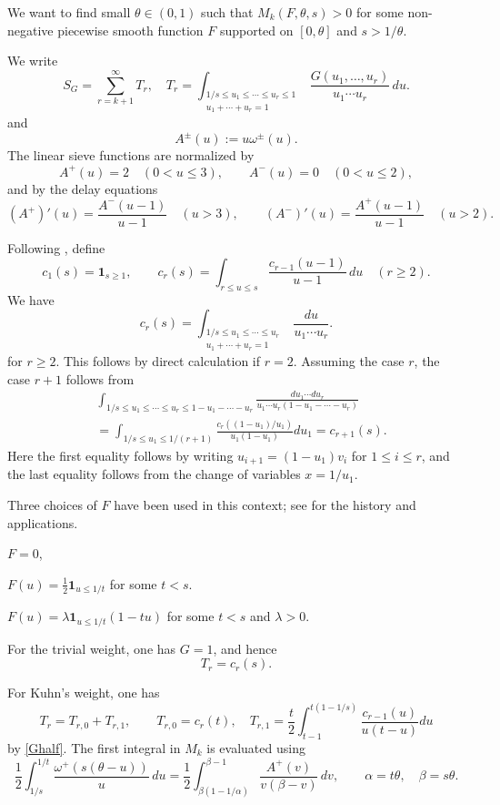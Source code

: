 \documentclass{amsart}
\theoremstyle{definition}
\theoremstyle{remark}
\newcommand{\1}{
    \bm{1}
}
\begin{document}
We want to find small $\theta \in (0,1)$ such that $M_k(F,\theta,s)>0$ for some non-negative piecewise smooth function $F$ supported on $[0,\theta]$ and $s>1/\theta$. 


We write
\[ S_G = 
\sum_{r=k+1}^{\infty} T_r, \quad T_r = 
\int_{\substack{1/s\le u_1\le \cdots\le u_r\le 1\\
u_1+\cdots+u_r=1}}
\frac{G(u_1,\ldots,u_r)}{u_1\cdots u_r}\,
du.
\]
and
\[
A^\pm(u):=u\omega^\pm(u).
\]
The linear sieve functions are normalized by
\[
A^+(u)=2 \quad (0<u\le 3),\qquad
A^-(u)=0 \quad (0<u\le 2),
\]
and by the delay equations
\[
(A^+)'(u)=\frac{A^-(u-1)}{u-1}\quad (u>3),\qquad
(A^-)'(u)=\frac{A^+(u-1)}{u-1}\quad (u>2).
\]

Following \cite{matomaki2025weighted}, define
\[
c_1(s)=\1_{s\ge1},\qquad
c_r(s)=\int_{r \leq u \leq s} \frac{c_{r-1}(u-1)}{u-1}\,du
\quad (r\ge2).
\]
We have
\[
c_r(s)=
\int_{\substack{1/s\le u_1\le\cdots\le u_r\\
u_1+\cdots+u_r=1}}
\frac{du}{u_1\cdots u_r}.
\]
for $r \geq 2$. This follows by direct calculation if $r=2$. Assuming the case $r$, the case $r+1$ follows from
\begin{align*}
&\int_{1/s\le u_1\le\cdots\le u_r \leq 1 - u_1 - \cdots - u_{r}} \frac{du_1 \cdots du_r}{u_1\cdots u_{r} (1 - u_1 - \cdots - u_r)} \\
&= \int_{1/s \leq u_1 \leq 1/(r+1)} \frac{c_r((1-u_1)/u_1)}{u_1(1-u_1)} du_1 = c_{r+1}(s). 
\end{align*}
Here the first equality follows by writing
\(u_{i+1}=(1-u_1)v_i\) for \(1\le i\le r\), and the last equality follows from the change of variables \(x=1/u_1\).


Three choices of \(F\) have been used in this context; see \cite{matomaki2025weighted} for the history and applications. 

\par
{} $F=0$, \par
{} $F(u)=\frac12\1_{u\le1/t}$ for some $t<s$. \par
{} $F(u)=\lambda\1_{u\le1/t}(1-tu)$ for some $t<s$ and $\lambda>0$. \par





For the trivial weight, one has \(G=1\), and hence
\[ T_r= c_{r}(s). \]

For Kuhn's weight, one has
\[ T_r=T_{r,0}+T_{r,1}, \qquad T_{r,0} =c_r(t), \quad T_{r,1} = \frac{t}{2}\int_{t-1}^{t(1-1/s)} \frac{c_{r-1}(u)}{u(t-u)}du \]
by \eqref{Ghalf}. The first integral in \(M_k\) is evaluated using
\[
\frac12\int_{1/s}^{1/t}\frac{\omega^+(s(\theta-u))}{u}\,du
=
\frac12\int_{\beta(1-1/\alpha)}^{\beta-1}
\frac{A^+(v)}{v(\beta-v)}\,dv,
\qquad
\alpha=t\theta,\quad \beta=s\theta.
\]
\end{document}
